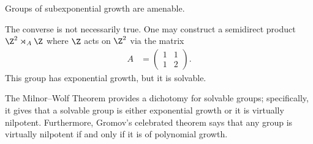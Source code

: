 \documentclass[10pt]{mypackage}
\begin{document}
\begin{corollary}
  Groups of subexponential growth are amenable.
\end{corollary}
The converse is not necessarily true. One may construct a semidirect product $\Z^2\rtimes_{A}\Z$ where $\Z$ acts on $\Z^2$ via the matrix
\begin{align*}
  A &= \begin{pmatrix}1 & 1 \\ 1 & 2\end{pmatrix}.
\end{align*}
This group has exponential growth, but it is solvable.
\begin{remark}
  The Milnor--Wolf Theorem provides a dichotomy for solvable groups; specifically, it gives that a solvable group is either exponential growth or it is virtually nilpotent. Furthermore, Gromov's celebrated theorem says that any group is virtually nilpotent if and only if it is of polynomial growth.
\end{remark}
\end{document}
